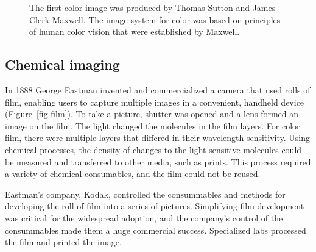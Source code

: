 \documentclass[
  letterpaper,
]{book}
\begin{document}
\begin{figure}


\caption{\label{fig-maxwell-sutton}The first color image was produced by
Thomas Sutton and James Clerk Maxwell. The image system for color was
based on principles of human color vision that were established by
Maxwell.}

\end{figure}%

\subsection*{Chemical imaging}\label{sec-preface-film}

In 1888 George Eastman invented and commercialized a camera that used
rolls of film, enabling users to capture multiple images in a
convenient, handheld device (Figure~\ref{fig-film}). To take a picture,
shutter was opened and a lens formed an image on the film. The light
changed the molecules in the film layers. For color film, there were
multiple layers that differed in their wavelength sensitivity. Using
chemical processes, the density of changes to the light-sensitive
molecules could be measured and transferred to other media, such as
prints. This process required a variety of chemical consumables, and the
film could not be reused.

Eastman's company, Kodak, controlled the consummables and methods for
developing the roll of film into a series of pictures. Simplifying film
development was critical for the widespread adoption, and the company's
control of the consummables made them a huge commercial success.
Specialized labs processed the film and printed the image.
\end{document}

